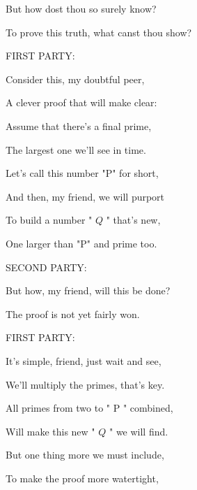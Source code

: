 \documentclass[10pt]{article}
\begin{document}
\hspace*{1em} But how dost thou so surely know?

\hspace*{1em} To prove this truth, what canst thou show?

\hspace*{1em} FIRST PARTY:

\hspace*{1em} Consider this, my doubtful peer,

\hspace*{1em} A clever proof that will make clear:

\hspace*{1em} Assume that there's a final prime,

\hspace*{1em} The largest one we'll see in time.

\hspace*{1em} Let's call this number "P" for short,

\hspace*{1em} And then, my friend, we will purport

\hspace*{1em} To build a number " \(Q\) " that's new,

\hspace*{1em} One larger than "P" and prime too.

\hspace*{1em} SECOND PARTY:

\hspace*{1em} But how, my friend, will this be done?

\hspace*{1em} The proof is not yet fairly won.

\hspace*{1em} FIRST PARTY:

\hspace*{1em} It's simple, friend, just wait and see,

\hspace*{1em} We'll multiply the primes, that's key.

\hspace*{1em} All primes from two to " \(\mathrm{P}\) " combined,

\hspace*{1em} Will make this new " \(Q\) " we will find.

\hspace*{1em} But one thing more we must include,

\hspace*{1em} To make the proof more watertight,
\end{document}
